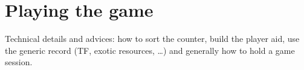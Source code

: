 
\chapter{Playing the game}\label{chapter:Playing}

\begin{todo}
  Technical details and advices: how to sort the counter, build the player
  aid, use the generic record (TF, exotic resources, \ldots) and generally how
  to hold a game session.
\end{todo}

